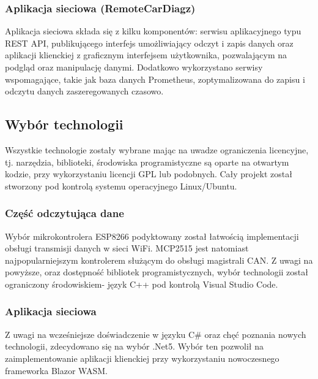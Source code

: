 \documentclass[10pt,a4paper]{scrartcl}
\begin{document}
		\subsubsection{Aplikacja sieciowa (RemoteCarDiagz)}
		Aplikacja sieciowa składa się z kilku komponentów: serwisu aplikacyjnego typu REST API, publikującego interfejs umożliwiający odczyt i zapis danych oraz aplikacji klienckiej z graficznym interfejsem użytkownika, pozwalającym na podgląd oraz manipulację danymi. Dodatkowo wykorzystano serwisy wspomagające, takie jak baza danych Prometheus, zoptymalizowana do zapisu i odczytu danych zaszeregowanych czasowo.
		
		\subsection{Wybór technologii}
		Wszystkie technologie zostały wybrane mając na uwadze ograniczenia licencyjne, tj. narzędzia, biblioteki, środowiska programistyczne są oparte na otwartym kodzie, przy wykorzystaniu licencji GPL lub podobnych. Cały projekt został stworzony pod kontrolą systemu operacyjnego Linux/Ubuntu.
			\subsubsection{Część odczytująca dane}
			Wybór mikrokontrolera ESP8266 podyktowany został łatwością implementacji obsługi transmisji danych w sieci WiFi.  MCP2515 jest natomiast najpopularniejszym kontrolerem służącym do obsługi magistrali CAN.  
			Z uwagi na powyższe, oraz dostępność bibliotek programistycznych, wybór technologii został ograniczony środowiskiem- język C++ pod kontrolą Visual Studio Code.
			\subsubsection{Aplikacja sieciowa}
			Z uwagi na wcześniejsze doświadczenie w języku C\# oraz chęć poznania nowych technologii, zdecydowano się na wybór .Net5. Wybór ten pozwolił na zaimplementowanie aplikacji klienckiej przy wykorzystaniu nowoczesnego frameworka Blazor WASM.
	
\end{document}

